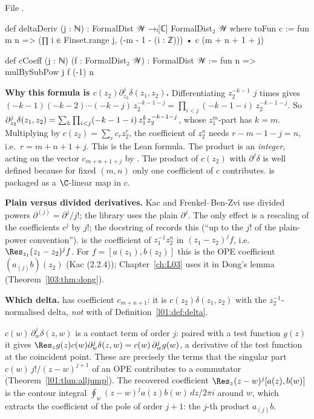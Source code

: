 \noindent File .
\begin{leancode}
def deltaDeriv (j : ℕ) : FormalDist 𝒲 →ₗ[ℂ] FormalDist₂ 𝒲 where
  toFun c := fun m n => (∏ i ∈ Finset.range j, (-m - 1 - (i : ℤ))) • c (m + n + 1 + j)

def cCoeff (j : ℕ) (f : FormalDist₂ 𝒲) : FormalDist 𝒲 := fun n => mulBySubPow j f (-1) n
\end{leancode}

\begin{dictionary}
\textbf{Why this formula is $c(z_2)\partial_{z_2}^j\delta(z_1,z_2)$.} Differentiating $z_2^{-k-1}$ $j$ times gives
$(-k-1)(-k-2)\cdots(-k-j)\,z_2^{-k-1-j} = \prod_{i<j}(-k-1-i)\,z_2^{-k-1-j}$. So
$\partial_{z_2}^j\delta(z_1,z_2) = \sum_k\prod_{i<j}(-k-1-i)\,z_1^kz_2^{-k-1-j}$, whose $z_1^m$-part has $k = m$.
Multiplying by $c(z_2) = \sum_rc_rz_2^r$, the coefficient of $z_2^n$ needs $r-m-1-j = n$, i.e.\
$r = m+n+1+j$. This is the Lean formula. The product is an \emph{integer}, acting on the vector
$c_{m+n+1+j}$ by \lean{•}. The product of $c(z_2)$ with $\partial^j\delta$ is well defined because for fixed
$(m,n)$ only one coefficient of $c$ contributes. \lean{deltaDeriv j} is packaged as a $\C$-linear map in $c$.

\textbf{Plain versus divided derivatives.} Kac and Frenkel--Ben-Zvi use divided powers
$\partial^{(j)} = \partial^j/j!$; the library uses the plain $\partial^j$. The only effect is a rescaling of the
coefficients $c^j$ by $j!$; the docstring of \lean{cCoeff} records this (``up to the $j!$ of the
plain-power convention''). \lean{cCoeff j f n} is the coefficient of $z_1^{-1}z_2^{n}$ in $(z_1-z_2)^jf$, i.e.\
$\Res_{z_1}(z_1-z_2)^jf$. For $f = [a(z_1),b(z_2)]$ this is the OPE coefficient $(a_{(j)}b)(z_2)$
(Kac (2.2.4)); Chapter~\ref{ch:L03} uses it in Dong's lemma (Theorem~\ref{l03:thm:dong}).

\textbf{Which delta.} \lean{deltaDeriv 0 c} has coefficient $c_{m+n+1}$: it is $c(z_2)\delta(z_1,z_2)$ with the
$z_2^{-1}$-normalised delta, \emph{not} with  of Definition~\ref{l01:def:delta}.
\end{dictionary}

\begin{physics}
$c(w)\,\partial_w^j\delta(z,w)$ is a contact term of order $j$: paired with a test function $g(z)$ it gives
$\Res_z g(z)c(w)\partial_w^j\delta(z,w) = c(w)\,\partial_w^jg(w)$, a derivative of the test function at the
coincident point. These are precisely the terms that the singular part $c(w)\,j!/(z-w)^{j+1}$ of an OPE
contributes to a commutator (Theorem~\ref{l01:thm:alljump}). The recovered coefficient
$\Res_z(z-w)^j[a(z),b(w)]$ is the contour integral $\oint_w (z-w)^ja(z)b(w)\,dz/2\pi i$ around $w$, which
extracts the coefficient of the pole of order $j+1$: the $j$-th product $a_{(j)}b$.
\end{physics}

